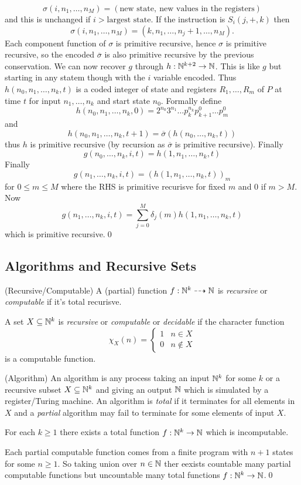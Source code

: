 \documentclass[tikx, border = 10pt]{article}
\begin{document}
\[
	\sigma(i,n_1,\dots, n_M) = (\text{new state},\ \text{new values in the registers})
\]
and this is unchanged if $ i > \text{largest state} $. If the instruction is $ S_i(j,+,k) $ then 
\[
  \sigma(i,n_1,\dots, n_M) = (k, n_1,\dots, n_j+1,\dots, n_M). 
\]
Each component function of $ \sigma $ is primitive recursive, hence $ \sigma $ is primitive recursive, so the encoded $ \overline \sigma $ is also primitive recursive by the previous conservation. We can now recover $ g $ through $ h: \mathbb{N}^{k+2} \to \mathbb{N} $. This is like $ g $ but starting in any statem though with the $ i $ variable encoded. Thus $ h(n_0,n_1,\dots, n_k,t) $ is a coded integer of state and registers $ R_1,\dots, R_m $ of $ P $ at time $ t $ for input $ n_1,\dots, n_k $ and start state $ n_0 $. Formally define
\[
	h(n_0,n_1,\dots, n_k,0) = 2^{n_0}3^{n_1}\dots p_k^{n_k}p_{k+1}^0\dots p_m^0
\]
and
\[
  h(n_0,n_1,\dots, n_k,t+1) = \overline \sigma(h(n_0,\dots, n_k,t))
\]
thus $ h $ is primitive recursive (by recursion as $ \overline \sigma $ is primitive recursive). Finally 
\[
  g(n_0,\dots, n_k,i,t) = h(1,n_1,\dots, n_k,t)
\]
Finally
\[
  g(n_1,\dots, n_k,i,t) = (h(1,n_1,\dots, n_k,t))_m
\]
for $ 0\le m \le M $ where the RHS is primitive recurisve for fixed $ m $ and $ 0 $ if $ m > M $. Now
\[
	g(n_1,\dots, n_k,i,t) = \sum_{j=0}^M \delta_j(m) h(1,n_1,\dots, n_k,t)
\]
which is primitive recursive.\qed
\subsection{Algorithms and Recursive Sets}
\begin{definition}
	(Recursive/Computable) A (partial) function $ f: \mathbb{N}^k \dashrightarrow \mathbb{N} $ is \textit{recursive} or \textit{computable} if it's total recurisve.\par
	A set $ X\subseteq \mathbb{N}^k $ is \textit{recursive} or \textit{computable} or \textit{decidable} if the character function 
	\[
	  \chi_X(n) = \begin{cases}
		  1 & n \in X \\
		  0 & n \notin X
	  \end{cases}
	\]
	is a computable function.
\end{definition}
\begin{definition}
	(Algorithm) An algorithm is any process taking an input $ \mathbb{N}^k $ for some $ k $ or a recursive subset $ X\subseteq \mathbb{N}^k $ and giving an output $ \mathbb{N} $ which is simulated by a register/Turing machine. An algorithm is \textit{total} if it terminates for all elements in $ X $ and a \textit{partial} algorithm may fail to terminate for some elements of input $ X $.
\end{definition}
\begin{lemma}
  For each $ k\ge 1 $ there exists a total function $ f : \mathbb{N}^k \to \mathbb{N} $ which is incomputable.
\end{lemma}
\pf Each partial computable function comes from a finite program with $ n+1 $ states for some $ n\ge 1 $. So taking union over $ n\in \mathbb{N} $ ther eexists countable many partial computable functions but uncountable many total functions $ f:\mathbb{N}^k \to \mathbb{N} $.\qed
\end{document}
